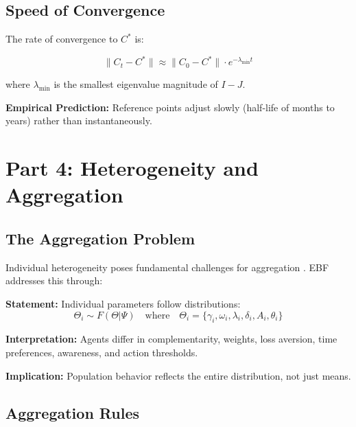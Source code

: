 \subsection{Speed of Convergence}

The rate of convergence to $C^*$ is:

\begin{equation}
\|C_t - C^*\| \approx \|C_0 - C^*\| \cdot e^{-\lambda_{\min} t}
\end{equation}

where $\lambda_{\min}$ is the smallest eigenvalue magnitude of $I - J$.

\textbf{Empirical Prediction:} Reference points adjust slowly (half-life of months
to years) rather than instantaneously.


\section{Part 4: Heterogeneity and Aggregation}
\label{sec:az-heterogeneity}

\subsection{The Aggregation Problem}

Individual heterogeneity poses fundamental challenges for aggregation
\citep{kirman1992whom}. EBF addresses this through:

\begin{tcolorbox}[colback=gray!5!white, colframe=gray!75!black,
    title=Axiom AZ-H1: Distributional Heterogeneity]
\textbf{Statement:} Individual parameters follow distributions:
\begin{equation}
\Theta_i \sim F(\Theta | \Psi) \quad \text{where} \quad \Theta_i = \{\gamma_i, \omega_i, \lambda_i, \delta_i, A_i, \theta_i\}
\end{equation}

\textbf{Interpretation:} Agents differ in complementarity, weights, loss aversion,
time preferences, awareness, and action thresholds.

\textbf{Implication:} Population behavior reflects the entire distribution, not just means.
\end{tcolorbox}

\subsection{Aggregation Rules}

